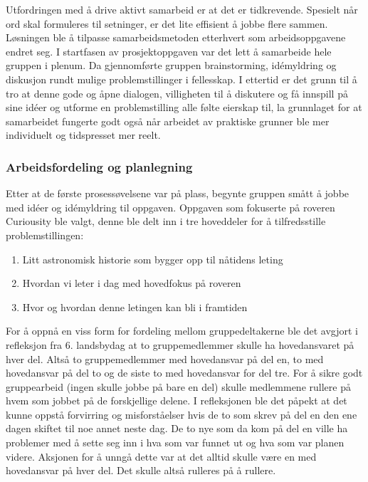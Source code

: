 Utfordringen med å drive aktivt samarbeid er at det er tidkrevende.
Spesielt når ord skal formuleres til setninger, er det lite effisient å jobbe flere sammen.
Løsningen ble å tilpasse samarbeidsmetoden etterhvert som arbeidsoppgavene endret seg.
I startfasen av prosjektoppgaven var det lett å samarbeide hele gruppen i plenum.
Da gjennomførte gruppen brainstorming, id\'{e}myldring og diskusjon rundt mulige problemstillinger i fellesskap.
I ettertid er det grunn til å tro at denne gode og åpne dialogen, villigheten til å diskutere og få innspill på sine id\'{e}er og utforme en problemstilling alle følte eierskap til, la grunnlaget for at samarbeidet fungerte godt også når arbeidet av praktiske grunner ble mer individuelt og tidspresset mer reelt.

\subsubsection{Arbeidsfordeling og planlegning}
Etter at de første prosessøvelsene var på plass, begynte gruppen smått å jobbe med id\'{e}er og id\'{e}myldring til oppgaven.
Oppgaven som fokuserte på roveren Curiousity ble valgt, denne ble delt inn i tre hoveddeler for å tilfredsstille problemstillingen:
\begin{enumerate}
\item Litt astronomisk historie som bygger opp til nåtidens leting
\item Hvordan vi leter i dag med hovedfokus på roveren
\item Hvor og hvordan denne letingen kan bli i framtiden
\end{enumerate}
For å oppnå en viss form for fordeling mellom gruppedeltakerne ble det avgjort i refleksjon fra 6. landsbydag at to gruppemedlemmer skulle ha hovedansvaret på hver del.
Altså to gruppemedlemmer med hovedansvar på del en, to med hovedansvar på del to og de siste to med hovedansvar for del tre.
For å sikre godt gruppearbeid (ingen skulle jobbe på bare en del) skulle medlemmene rullere på hvem som jobbet på de forskjellige delene.
I refleksjonen ble det påpekt at det kunne oppstå forvirring og misforståelser hvis de to som skrev på del en den ene dagen skiftet til noe annet neste dag.
De to nye som da kom på del en ville ha problemer med å sette seg inn i hva som var funnet ut og hva som var planen videre.
Aksjonen for å unngå dette var at det alltid skulle være en med hovedansvar på hver del.
Det skulle altså rulleres på å rullere.

